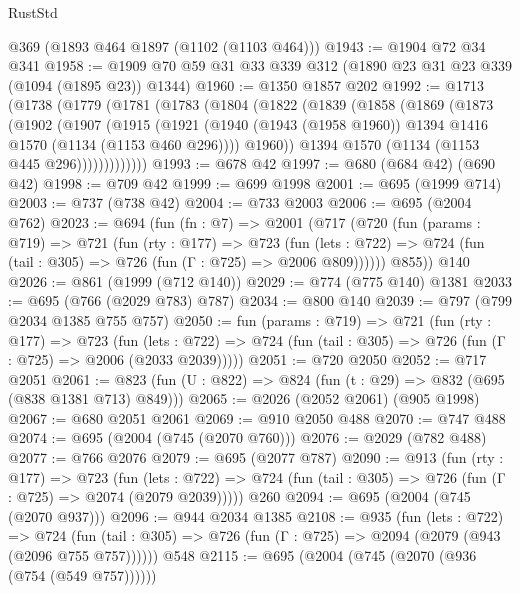\begin{lexlean}{RustStd}
\begin{coremodule}
    @369
    (@1893 @464 @1897 (@1102 (@1103 @464)))
@1943 := @1904 @72 @34 @341
@1958 := @1909 @70 @59 @31 @33 @339 @312 (@1890 @23 @31 @23 @339 (@1094 (@1895 @23)) @1344)
@1960 := @1350 @1857 @202
@1992 := @1713
    (@1738
      (@1779
        (@1781
          (@1783
            (@1804
              (@1822
                (@1839
                  (@1858
                    (@1869
                      (@1873
                        (@1902
                          (@1907
                            (@1915
                              (@1921
                                (@1940
                                  (@1943 (@1958 @1960))
                                  @1394
                                  @1416
                                  @1570
                                  (@1134 (@1153 @460 @296))))
                              @1960))
                          @1394
                          @1570
                          (@1134 (@1153 @445 @296)))))))))))))
@1993 := @678 @42
@1997 := @680 (@684 @42) (@690 @42)
@1998 := @709 @42
@1999 := @699 @1998
@2001 := @695 (@1999 @714)
@2003 := @737 (@738 @42)
@2004 := @733 @2003
@2006 := @695 (@2004 @762)
@2023 := @694
    (fun (fn : @7) =>
    @2001
      (@717
        (@720
          (fun (params : @719) =>
          @721
            (fun (rty : @177) =>
            @723
              (fun (lets : @722) =>
              @724 (fun (tail : @305) => @726 (fun (Γ : @725) => @2006 @809))))))
        @855))
    @140
@2026 := @861 (@1999 (@712 @140))
@2029 := @774 (@775 @140) @1381
@2033 := @695 (@766 (@2029 @783) @787)
@2034 := @800 @140
@2039 := @797 (@799 @2034 @1385 @755 @757)
@2050 := fun (params : @719) =>
  @721
    (fun (rty : @177) =>
    @723
      (fun (lets : @722) =>
      @724 (fun (tail : @305) => @726 (fun (Γ : @725) => @2006 (@2033 @2039)))))
@2051 := @720 @2050
@2052 := @717 @2051
@2061 := @823 (fun (U : @822) => @824 (fun (t : @29) => @832 (@695 (@838 @1381 @713) @849)))
@2065 := @2026 (@2052 @2061) (@905 @1998)
@2067 := @680 @2051 @2061
@2069 := @910 @2050 @488
@2070 := @747 @488
@2074 := @695 (@2004 (@745 (@2070 @760)))
@2076 := @2029 (@782 @488)
@2077 := @766 @2076
@2079 := @695 (@2077 @787)
@2090 := @913
    (fun (rty : @177) =>
    @723
      (fun (lets : @722) =>
      @724 (fun (tail : @305) => @726 (fun (Γ : @725) => @2074 (@2079 @2039)))))
    @260
@2094 := @695 (@2004 (@745 (@2070 @937)))
@2096 := @944 @2034 @1385
@2108 := @935
    (fun (lets : @722) =>
    @724 (fun (tail : @305) => @726 (fun (Γ : @725) => @2094 (@2079 (@943 (@2096 @755 @757))))))
    @548
@2115 := @695 (@2004 (@745 (@2070 (@936 (@754 (@549 @757))))))

\end{coremodule}
\end{lexlean}
